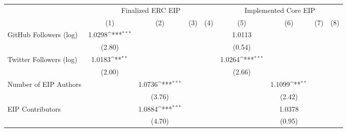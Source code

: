 {
\def\sym#1{\ifmmode^{#1}\else\(^{#1}\)\fi}
\begin{tabular}{l*{8}{c}}
\hline\hline
                                   &\multicolumn{4}{c}{Finalized ERC EIP}                                                  &\multicolumn{4}{c}{Implemented Core EIP}                                               \\\cmidrule(lr){2-5}\cmidrule(lr){6-9}
                                   &\multicolumn{1}{c}{(1)}         &\multicolumn{1}{c}{(2)}         &\multicolumn{1}{c}{(3)}         &\multicolumn{1}{c}{(4)}         &\multicolumn{1}{c}{(5)}         &\multicolumn{1}{c}{(6)}         &\multicolumn{1}{c}{(7)}         &\multicolumn{1}{c}{(8)}         \\
\hline
GitHub Followers (log)             &      1.0298\sym{***}&                     &                     &                     &      1.0113         &                     &                     &                     \\
                                   &      (2.80)         &                     &                     &                     &      (0.54)         &                     &                     &                     \\
[1em]
Twitter Followers (log)            &      1.0183\sym{**} &                     &                     &                     &      1.0264\sym{***}&                     &                     &                     \\
                                   &      (2.00)         &                     &                     &                     &      (2.66)         &                     &                     &                     \\
[1em]
Number of EIP Authors              &                     &      1.0736\sym{***}&                     &                     &                     &      1.1099\sym{**} &                     &                     \\
                                   &                     &      (3.76)         &                     &                     &                     &      (2.42)         &                     &                     \\
[1em]
EIP Contributors                   &                     &      1.0884\sym{***}&                     &                     &                     &      1.0378         &                     &                     \\
                                   &                     &      (4.70)         &                     &                     &                     &      (0.95)         &                     &                     \\

\end{tabular}}
